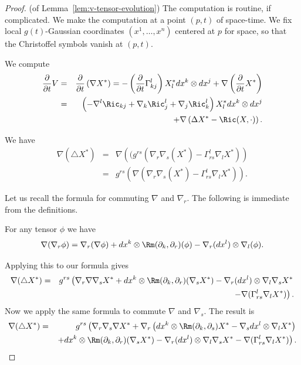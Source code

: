 \begin{proof}(of Lemma~\ref{lem:v-tensor-evolution})
The computation is routine, if complicated. We make the computation
at a point $(p,t)$ of space-time. We fix local $g(t)$-Gaussian
coordinates $(x^1,\ldots,x^n)$ centered at $p$ for space, so that
the Christoffel symbols vanish at $(p,t)$.

 We
compute
\begin{eqnarray}\nonumber
\frac{\partial}{\partial t}V  &  = &\frac{\partial}{\partial
t}\left( \nabla X^* \right) =-\left( \frac{\partial}{\partial
t}\Gamma_{kj}^{l}\right)  X^*_{l}dx^k\otimes dx^j +\nabla\left(
\frac{\partial}{\partial t}X^*\right) \\ \nonumber
 &= &
\left(-\nabla^{l}\Ric_{kj}+\nabla_{k}\Ric_j^l+\nabla_{j}\Ric_k^l\right)X^*_{l}dx^k\otimes
dx^j \\
& & +\nabla\left(  \Delta X^*-\Ric(X,\cdot)\right)
.\label{eqn1}
\end{eqnarray}

We have \begin{eqnarray*} \nabla(\triangle X^*) & = &
\nabla\left((g^{rs}\left(\nabla_r\nabla_s(X^*)-\Gamma_{rs}^l\nabla_lX^*\right)\right)
\\
&= &
g^{rs}\left(\nabla\left(\nabla_r\nabla_s(X^*)-\Gamma_{rs}^l\nabla_lX^*\right)\right).
\end{eqnarray*}

Let us recall the formula for commuting $\nabla$ and $\nabla_r$. The
following is immediate from the definitions.

\begin{claim}
\label{claim:commuting-covariant-derivatives}
For any tensor $\phi$ we have
$$\nabla(\nabla_r\phi)=\nabla_r(\nabla\phi)+dx^k\otimes
\Rm(\partial_k,\partial_r)(\phi)-\nabla_r(dx^l)\otimes
\nabla_l(\phi).$$
\end{claim}

Applying this to our formula gives
\begin{eqnarray*}\nabla(\triangle
X^*) & = &  g^{rs}\left(\nabla_r\nabla\nabla_sX^*+dx^k\otimes \Rm(\partial_k,\partial_r)(\nabla_sX^*)-\nabla_r(dx^l)\otimes
\nabla_l\nabla_sX^* \right. \\
& & \left. -\nabla(\Gamma_{rs}^l\nabla_lX^*)\right) .
\end{eqnarray*}
 Now we
apply the same formula to commute $\nabla$ and $\nabla_s$. The
result is
\begin{eqnarray*}
\nabla(\triangle X^*) & = & g^{rs}\left(\nabla_r\nabla_s\nabla
X^*+\nabla_r\left(dx^k\otimes \Rm(\partial_k,\partial_s)X^*-\nabla_sdx^l\otimes \nabla_lX^*\right)\right. \\
& & \left. +dx^k\otimes \Rm(\partial_k,\partial_r)(\nabla_sX^*)-\nabla_r(dx^l)\otimes
\nabla_l\nabla_sX^*-\nabla(\Gamma_{rs}^l\nabla_lX^*)\right).
\end{eqnarray*}


\end{proof}
